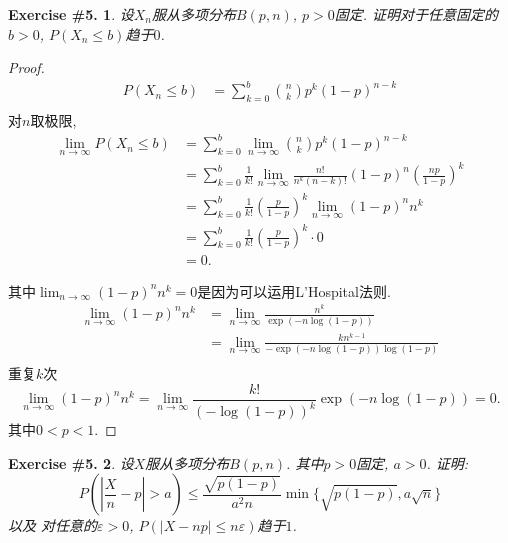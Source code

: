 \documentclass[UTF8, a4paper]{article}
\newtheorem{exercise}{Exercise \#5.}
\begin{document}
\begin{framed}
\begin{exercise}
设\(X_n\)服从多项分布\(B(p,n)\), \(p>0\)固定. 证明对于任意固定的\(b>0\), \(P(X_n \leq b)\)趋于\(0\). 
\end{exercise}
\end{framed}

\begin{proof}
$$
\begin{aligned}
    P(X_n \leq b) &= \sum_{k=0}^{b} \binom{n}{k}p^k(1-p)^{n-k} \\
\end{aligned}
$$
对\(n\)取极限, 
$$
\begin{aligned}
    \lim_{n\to \infty} P(X_n \leq b) &=  \sum_{k=0}^{b} \lim_{n\to \infty} \binom{n}{k}p^k(1-p)^{n-k} \\
    &= \sum_{k=0}^{b} \frac{1}{k!} \lim_{n\to \infty} \frac{n!}{n^k(n - k)!} (1-p)^n \left(\frac{np}{1 - p}\right)^k\\
    &= \sum_{k=0}^{b} \frac{1}{k!} \left(\frac{p}{1 - p}\right)^k \lim_{n\to \infty} (1-p)^n n^k \\
    &= \sum_{k=0}^{b} \frac{1}{k!} \left(\frac{p}{1 - p}\right)^k \cdot 0\\
    &= 0.
\end{aligned}
$$

其中\(\lim_{n\to\infty} (1 - p)^n n^k = 0\)是因为可以运用L'Hospital法则.
\begin{align*}
    \lim_{n\to\infty} (1 - p)^n n^k &= \lim_{n\to\infty} \frac{n^k}{\exp(-n\log(1-p))} \\
    &= \lim_{n\to\infty} \frac{k n^{k-1}}{-\exp(-n\log(1-p))\log(1-p)} \\
\end{align*}
重复\(k\)次
$$
\lim_{n\to\infty} (1 - p)^n n^k = \lim_{n\to\infty} \frac{k!}{(-\log(1-p))^k} \exp(-n\log(1-p)) = 0.
$$
其中\(0<p<1\).
\end{proof}



\begin{framed}
\begin{exercise}
    设\(X\)服从多项分布\(B(p,n)\). 其中\(p>0\)固定, \(a>0\). 证明:
$$
P\left(\left|\frac{X}{n}-p\right|>a\right) \leq \frac{\sqrt{p(1-p)}}{a^2 n} \min \{\sqrt{p(1-p)}, a \sqrt{n}\}
$$
以及
对任意的\(\varepsilon > 0\), \(P(|X - np| \leq n\varepsilon)\)趋于\(1\).
\end{exercise}
\end{framed}
\end{document}
